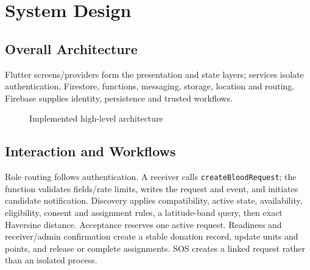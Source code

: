 \chapter{System Design}\label{ch:design}
\section{Overall Architecture}
Flutter screens/providers form the presentation and state layers; services isolate authentication, Firestore, functions, messaging, storage, location and routing. Firebase supplies identity, persistence and trusted workflows.
\begin{figure}[H]\centering
{}\caption{Implemented high-level architecture}\end{figure}
\section{Interaction and Workflows}
Role routing follows authentication. A receiver calls \texttt{createBloodRequest}; the function validates fields/rate limits, writes the request and event, and initiates candidate notification. Discovery applies compatibility, active state, availability, eligibility, consent and assignment rules, a latitude-band query, then exact Haversine distance. Acceptance reserves one active request. Readiness and receiver/admin confirmation create a stable donation record, update units and points, and release or complete assignments. SOS creates a linked request rather than an isolated process.
